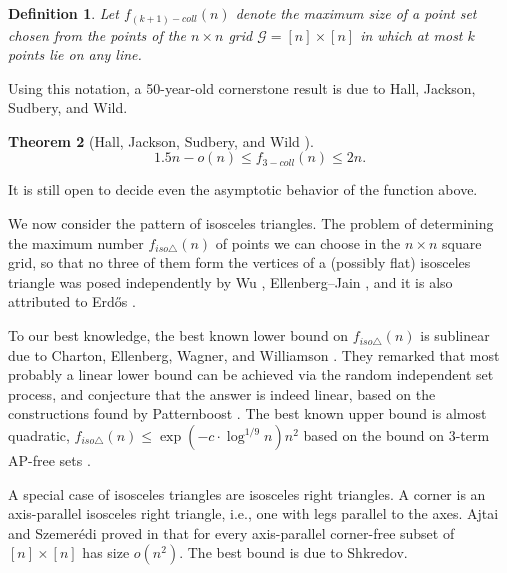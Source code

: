 \documentclass[11pt]{article}
\theoremstyle{plain}
\newtheorem{theorem}{\bf Theorem}[section]
\newtheorem{defi}[theorem]{\bf Definition}
\newcommand\cG{{\mathcal G}}
\begin{document}
	\begin{defi}
		Let $f_{(k+1)-coll}(n)$ denote the maximum size of a point set chosen from the points  of  the $n\times n$ grid $\cG=[n]\times [n]$ in which at most $k$ points lie on any line.
	\end{defi}
	
	Using this notation, a 50-year-old
	cornerstone result is  due to Hall, Jackson, Sudbery, and Wild.
	
	\begin{theorem}[Hall, Jackson, Sudbery, and Wild \cite{hall1975some}]\label{hall}
		\[ 1.5n-o(n) \le f_{3-coll}(n)\le 2n.\]
	\end{theorem}
	
	It is still open to decide even the asymptotic behavior of the function above. 
	
	
	We now consider the pattern of isosceles triangles.
	The problem of determining  the maximum number $f_{iso\triangle}(n)$ of  points  we can choose in the $n\times  n$ square grid, so that no three of them form the
	vertices of a (possibly flat) isosceles triangle was posed independently by Wu \cite{Wu},  
	Ellenberg–Jain \cite{Ellen}, and it is also attributed to Erdős \cite{AI}.
	
	To our best knowledge, the best known lower bound on $f_{iso\triangle}(n)$ is sublinear due to Charton, Ellenberg, Wagner, and  Williamson \cite{AI}. They remarked that most probably a linear lower bound can be achieved via the random independent set process, and conjecture that the answer is indeed linear, based on the constructions found by Patternboost \cite{AI}. The best known upper bound is almost quadratic,  $f_{iso\triangle}(n)\le \exp(-c\cdot\log^{1/9}n)n^2$ based on the bound on $3$-term AP-free sets \cite{AI, KM}.
	
	A special case of isosceles triangles are isosceles right triangles. A corner is an axis-parallel isosceles right triangle, i.e., one with legs  parallel to the axes.
	Ajtai and Szemerédi proved in \cite{ASz} that for
	every axis-parallel corner-free subset of $[n] \times [n]$  has size $o(n^2)$.  The best bound is due to Shkredov.
	
\end{document}
